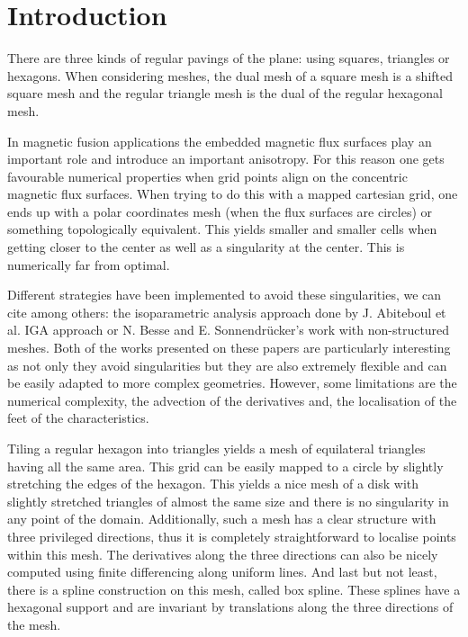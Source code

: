\documentclass[proc]{edpsmath}
\begin{document}
\maketitle


\section*{Introduction}


There are three kinds of regular pavings of the plane: using squares, triangles or hexagons. When considering meshes, the dual mesh of a square mesh is a shifted square mesh and the regular triangle mesh is the dual of the regular hexagonal mesh.

In magnetic fusion applications the embedded magnetic flux surfaces play an important role and introduce an important anisotropy\cite{Angelino2009}. For this reason one gets favourable numerical properties when grid points align on the concentric magnetic flux surfaces. When trying to do this with a mapped cartesian grid, one ends up with a polar coordinates mesh (when the flux surfaces are circles) or something topologically equivalent. This yields smaller and smaller cells when getting closer to the center as well as a singularity at the center. This is numerically far from optimal. 

Different strategies have been implemented to avoid these singularities, we can cite among others: the isoparametric analysis approach done by J. Abiteboul et al. \cite{abiteboul2011solving} IGA approach or N. Besse and E. Sonnendr\"{u}cker's work with non-structured meshes\cite{Besse2003341}. Both of the works presented on these papers are particularly interesting as not only they avoid singularities but they are also extremely flexible and can be easily adapted to more complex geometries. However, some limitations are the numerical complexity, the advection of the derivatives and, the localisation of the feet of the characteristics. 

Tiling a regular hexagon into triangles yields a mesh of equilateral triangles having all the same area. This grid can be easily mapped to a circle by slightly stretching the edges of the hexagon. This yields a nice mesh of a disk with slightly stretched triangles of almost the same size and there is no singularity in any point of the domain. 
Additionally, such a mesh has a clear structure with three privileged directions, thus it is completely straightforward to localise points within this mesh. The derivatives along the three directions can also be nicely computed using finite differencing along uniform lines. And last but not least, there is a spline construction on this mesh, called box spline. These splines have a hexagonal support and are invariant by translations along the three directions of the mesh. 
\end{document}
